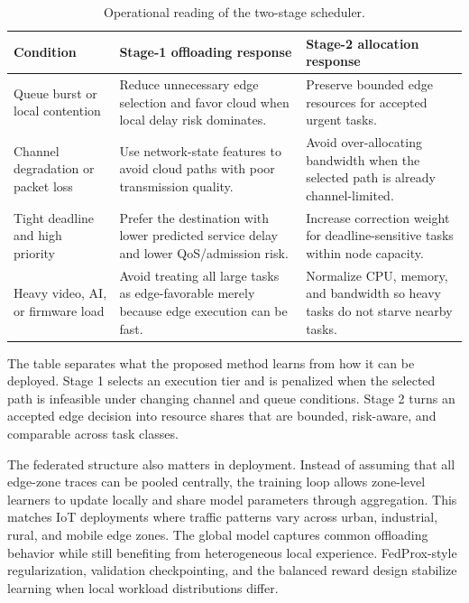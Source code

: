 \begin{table}[H]
\centering
\caption{Operational reading of the two-stage scheduler.}
\label{tab:deployment_reading}
\footnotesize
\renewcommand{\arraystretch}{1.08}
\begin{tabularx}{\columnwidth}{@{}>{\raggedright\arraybackslash}p{}>{\raggedright\arraybackslash}X>{\raggedright\arraybackslash}X@{}}
\toprule
Condition & Stage-1 offloading response & Stage-2 allocation response \\
\midrule
Queue burst or local contention & Reduce unnecessary edge selection and favor cloud when local delay risk dominates. & Preserve bounded edge resources for accepted urgent tasks. \\
Channel degradation or packet loss & Use network-state features to avoid cloud paths with poor transmission quality. & Avoid over-allocating bandwidth when the selected path is already channel-limited. \\
Tight deadline and high priority & Prefer the destination with lower predicted service delay and lower QoS/admission risk. & Increase correction weight for deadline-sensitive tasks within node capacity. \\
Heavy video, AI, or firmware load & Avoid treating all large tasks as edge-favorable merely because edge execution can be fast. & Normalize CPU, memory, and bandwidth so heavy tasks do not starve nearby tasks. \\
\bottomrule
\end{tabularx}
\end{table}

The table separates what the proposed method learns from how it can be deployed. Stage 1 selects an execution tier and is penalized when the selected path is infeasible under changing channel and queue conditions. Stage 2 turns an accepted edge decision into resource shares that are bounded, risk-aware, and comparable across task classes.

The federated structure also matters in deployment. Instead of assuming that all edge-zone traces can be pooled centrally, the training loop allows zone-level learners to update locally and share model parameters through aggregation. This matches IoT deployments where traffic patterns vary across urban, industrial, rural, and mobile edge zones. The global model captures common offloading behavior while still benefiting from heterogeneous local experience. FedProx-style regularization, validation checkpointing, and the balanced reward design stabilize learning when local workload distributions differ.


